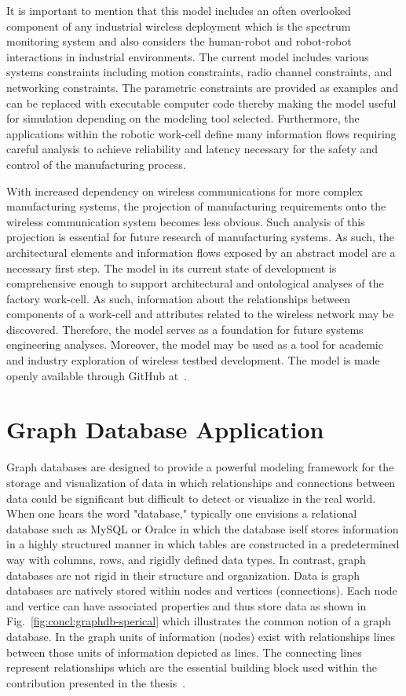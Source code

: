 It is important to mention that this model includes an often overlooked component of any industrial wireless deployment which is the spectrum monitoring system and also considers the human-robot and robot-robot interactions in industrial environments. The current model includes various systems constraints including motion constraints, radio channel constraints, and networking constraints. The parametric constraints are provided as examples and can be replaced with executable computer code thereby making the model useful for simulation depending on the modeling tool selected. Furthermore, the applications within the robotic work-cell define many information flows requiring careful analysis to achieve reliability and latency necessary for the safety and control of the manufacturing process.

With increased dependency on wireless communications for more complex manufacturing systems, the projection of manufacturing requirements onto the wireless communication system becomes less obvious. Such analysis of this projection is essential for future research of manufacturing systems. As such, the architectural elements and information flows exposed by an abstract model
are a necessary first step. The model in its current state of development is comprehensive enough to support architectural and ontological analyses of the factory work-cell.  As such, information about the relationships between components of a work-cell and attributes related to the wireless network may be discovered. Therefore, the model serves as a foundation for future systems engineering analyses. Moreover, the model may be used as a tool for academic and industry exploration of wireless testbed development.  The model is made openly available through GitHub at~\cite{SysML.Candell2018}.

\section{Graph Database Application}

Graph databases are designed to provide a powerful modeling framework for the storage and visualization of data in which relationships and connections between data could be significant but difficult to detect or visualize in the real world.  When one hears the word "database," typically one envisions a relational database such as MySQL or Oralce in which the database iself stores information in a highly structured manner in which tables are constructed in a predetermined way with columns, rows, and rigidly defined data types.  In contrast, graph databases are not rigid in their structure and organization.  Data is graph databases are natively stored within nodes and vertices (connections).  Each node and vertice can have associated properties and thus store data as shown in Fig.~\ref{fig:concl:graphdb-sperical} which illustrates the common notion of a graph database.  In the graph units of information (nodes) exist with relationships lines between those units of information depicted as lines.  The connecting lines represent relationships which are the essential building block used within the contribution presented in the thesis~\cite{CandellISIT2020.Conf}.  

